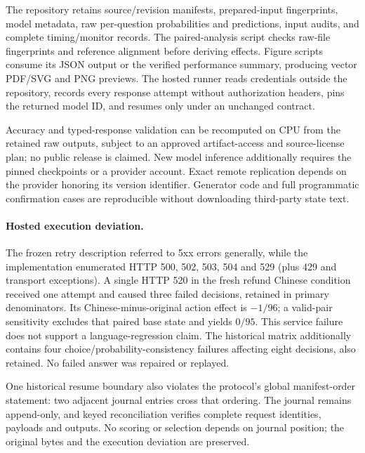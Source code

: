 The repository retains source/revision manifests, prepared-input fingerprints, model metadata, raw per-question probabilities and predictions, input audits, and complete timing/monitor records. The paired-analysis script checks raw-file fingerprints and reference alignment before deriving effects. Figure scripts consume its JSON output or the verified performance summary, producing vector PDF/SVG and PNG previews. The hosted runner reads credentials outside the repository, records every response attempt without authorization headers, pins the returned model ID, and resumes only under an unchanged contract.

Accuracy and typed-response validation can be recomputed on CPU from the retained raw outputs, subject to an approved artifact-access and source-license plan; no public release is claimed. New model inference additionally requires the pinned checkpoints or a provider account. Exact remote replication depends on the provider honoring its version identifier. Generator code and full programmatic confirmation cases are reproducible without downloading third-party state text.

\paragraph{Hosted execution deviation.}
The frozen retry description referred to 5xx errors generally, while the implementation enumerated HTTP 500, 502, 503, 504 and 529 (plus 429 and transport exceptions). A single HTTP 520 in the fresh refund Chinese condition received one attempt and caused three failed decisions, retained in primary denominators. Its Chinese-minus-original action effect is $-1/96$; a valid-pair sensitivity excludes that paired base state and yields $0/95$. This service failure does not support a language-regression claim. The historical matrix additionally contains four choice/probability-consistency failures affecting eight decisions, also retained. No failed answer was repaired or replayed.

One historical resume boundary also violates the protocol's global manifest-order statement: two adjacent journal entries cross that ordering. The journal remains append-only, and keyed reconciliation verifies complete request identities, payloads and outputs. No scoring or selection depends on journal position; the original bytes and the execution deviation are preserved.
